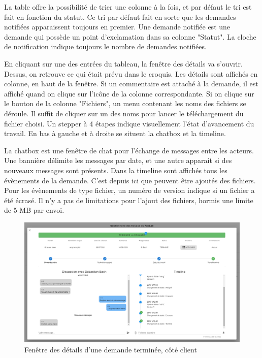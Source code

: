 \documentclass[
    iai, %
    eai, %
]{heig-tb}
\begin{document}
La table offre la possibilité de trier une colonne à la fois, et par défaut le tri est fait en fonction du statut.
Ce tri par défaut fait en sorte que les demandes notifiées apparaissent toujours en premier. Une demande notifiée est une demande qui possède un point d'exclamation dans sa colonne "Statut".
La cloche de notification indique toujours le nombre de demandes notifiées.

En cliquant sur une des entrées du tableau, la fenêtre des détails va s'ouvrir. Dessus, on retrouve ce qui était prévu dans le croquis. Les détails sont affichés en colonne, en haut de la fenêtre.
Si un commentaire est attaché à la demande, il est affiché quand on clique sur l'icône de la colonne correspondante. Si on clique sur le bouton de la colonne "Fichiers", un menu contenant les noms des fichiers se déroule. Il suffit de cliquer sur un des noms pour lancer le téléchargement du fichier choisi.
Un stepper à 4 étapes indique visuellement l'état d'avancement du travail. En bas à gauche et à droite se situent la chatbox et la timeline.

La chatbox est une fenêtre de chat pour l'échange de messages entre les acteurs. Une bannière délimite les messages par date, et une autre apparait si des nouveaux messages sont présents.
Dans la timeline sont affichés tous les évènements de la demande. C'est depuis ici que peuvent être ajoutés des fichiers. Pour les évènements de type fichier, un numéro de version indique si un fichier a été écrasé. Il n'y a pas de limitations pour l'ajout des fichiers, hormis une limite de 5 MB par envoi.

\begin{figure}[h]
  \includegraphics[width=14cm]{ui_jobinfo_client2.PNG}
  \caption{Fenêtre des détails d'une demande terminée, côté client}
\end{figure}
\end{document}
